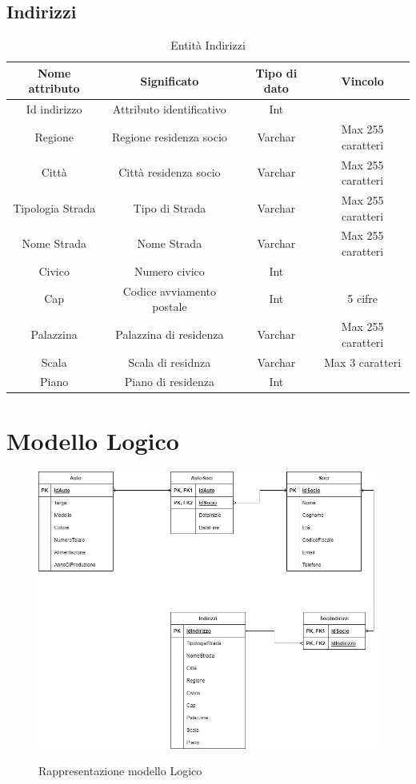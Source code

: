 \documentclass[12pt]{article}
\begin{document}
\subsection{Indirizzi}
\begin{table}[h!]
    \centering
    \begin{tabular}{|c|c|c|c|}
        \hline
        Nome attributo & Significato & Tipo di dato & Vincolo \\
        \hline
        Id indirizzo & Attributo identificativo & Int & \\
        \hline
        Regione & Regione residenza socio & Varchar & Max 255 caratteri \\
        \hline
        Città & Città residenza socio & Varchar & Max 255 caratteri \\
        \hline
        Tipologia Strada & Tipo di Strada & Varchar & Max 255 caratteri \\
        \hline
        Nome Strada & Nome Strada & Varchar & Max 255 caratteri \\
        \hline
        Civico & Numero civico & Int & \\
        \hline
        Cap & Codice avviamento postale & Int & 5 cifre \\
        \hline
        Palazzina & Palazzina di residenza & Varchar & Max 255 caratteri \\
        \hline
        Scala & Scala di residnza & Varchar & Max 3 caratteri \\
        \hline
        Piano & Piano di residenza & Int & \\
        \hline  
    \end{tabular}
    \caption{Entità Indirizzi}
    \label{tab:Entità Indirizzi}
\end{table}

\clearpage


\section{Modello Logico}
\begin{figure}[h!]
    \centering
    \includegraphics[width=16cm]{modello_logico_car_sharing.png}
    \label{fig:modello Logico}
    \caption{Rappresentazione modello Logico}
\end{figure}
\end{document}
